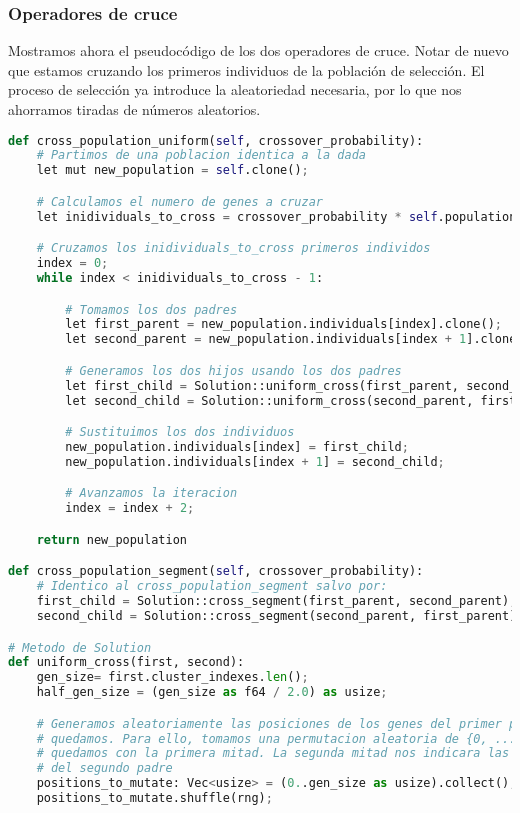 \documentclass[11pt]{article}
\begin{document}
\subsubsection{Operadores de cruce}

Mostramos ahora el pseudocódigo de los dos operadores de cruce. Notar de nuevo que estamos cruzando los primeros individuos de la población de selección. El proceso de selección ya introduce la aleatoriedad necesaria, por lo que nos ahorramos tiradas de números aleatorios.

\begin{lstlisting}[language=Python, style=Boxed]
def cross_population_uniform(self, crossover_probability):
    # Partimos de una poblacion identica a la dada
    let mut new_population = self.clone();

    # Calculamos el numero de genes a cruzar
    let inidividuals_to_cross = crossover_probability * self.population_size()

    # Cruzamos los inidividuals_to_cross primeros individos
    index = 0;
    while index < inidividuals_to_cross - 1:

        # Tomamos los dos padres
        let first_parent = new_population.individuals[index].clone();
        let second_parent = new_population.individuals[index + 1].clone();

        # Generamos los dos hijos usando los dos padres
        let first_child = Solution::uniform_cross(first_parent, second_parent);
        let second_child = Solution::uniform_cross(second_parent, first_parent);

        # Sustituimos los dos individuos
        new_population.individuals[index] = first_child;
        new_population.individuals[index + 1] = second_child;

        # Avanzamos la iteracion
        index = index + 2;

    return new_population

def cross_population_segment(self, crossover_probability):
    # Identico al cross_population_segment salvo por:
    first_child = Solution::cross_segment(first_parent, second_parent);
    second_child = Solution::cross_segment(second_parent, first_parent);

# Metodo de Solution
def uniform_cross(first, second):
    gen_size= first.cluster_indexes.len();
    half_gen_size = (gen_size as f64 / 2.0) as usize;

    # Generamos aleatoriamente las posiciones de los genes del primer padre con las que nos
    # quedamos. Para ello, tomamos una permutacion aleatoria de {0, ..., gen_size - 1} y nos
    # quedamos con la primera mitad. La segunda mitad nos indicara las posiciones que usamos
    # del segundo padre
    positions_to_mutate: Vec<usize> = (0..gen_size as usize).collect();
    positions_to_mutate.shuffle(rng);


\end{lstlisting}
\end{document}
